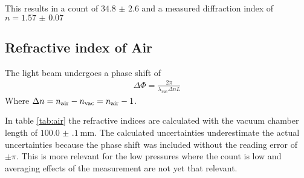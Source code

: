 This results in a count of $\num{34.8(26)}$ and a measured diffraction index of
$n = \num{1.57(7)}$

\subsection{Refractive index of Air}
The light beam undergoes a phase shift of
\begin{align}
	\Delta\Phi = \frac{2 \pi}{\lambda_{vac} \Delta n L }
\end{align}
Where $\Delta n = n_\text{air}- n_\text{vac} = n_\text{air}-1 $.

In table \ref{tab:air} the refractive indices are calculated with the vacuum
chamber length of $\qty{100.0(1)}{\mm}$. The calculated uncertainties
underestimate the actual uncertainties because the phase shift was included
without the reading error of $\pm \pi$. This is more relevant for the low
pressures where the count is low and averaging effects of the measurement are
not yet that relevant.

